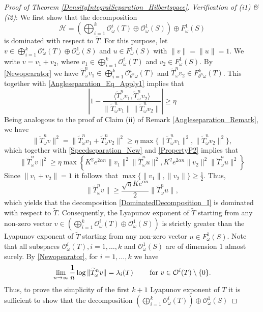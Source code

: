 \documentclass[pdflatex,sn-mathphys-num]{sn-jnl}%
\theoremstyle{thmstyleone}%
\theoremstyle{thmstyletwo}%
\theoremstyle{thmstylethree}%
\newcommand{\cH}{\mathcal{H}}
\numberwithin{equation}{section}
\begin{document}
\begin{proof}[Proof of Theorem \ref{DensityIntegralSeparation_Hilbertspace}]
\noindent 
\emph{Verification of (i1) \& (i2)}: 
We first show that the decomposition 
\begin{equation}\label{DominatedDecomposition_I}
\cH= \left(\bigoplus_{i=1}^k\mathcal O^i_{\omega}(T) \oplus \mathcal O_{\omega}^1(S)\right) \oplus F^1_{\omega}(S)
\end{equation}
is dominated with respect to $\widetilde T$. For this purpose, let $v\in \bigoplus_{i=1}^k\mathcal O^i_{\omega}(T) \oplus \mathcal O_{\omega}^1(S)$ and $u\in F^1_{\omega}(S)$ with $\|v\|=\|u\|=1$. We write $v=v_1+v_2$, where $v_1\in  \bigoplus_{i=1}^k\mathcal O^i_{\omega}(T)$ and $v_2\in F^1_{\omega}(S)$. By \eqref{Newopearator} we have ${\widetilde T}^n_{\omega}v_1\in \bigoplus_{i=1}^k\mathcal O^i_{\theta^n\omega}(T)$ and ${\widetilde T}^n_{\omega}v_2\in F^k_{\theta^n\omega}(T)$. This together with \eqref{Angleseparation_Eq_Apply1} implies that 
\[
\left|1- \frac{\langle  {\widetilde T}^n_{\omega}v_1, {\widetilde T}^n_{\omega}v_2 \rangle}{\|{\widetilde T}^n_{\omega}v_1\|\|{\widetilde T}^n_{\omega}v_2\|}\right|
\geq  
\eta
\]
Being  analogous to the proof of Claim (ii) of Remark \ref{Angleseparation_Remark}, we have 
\[
\|{\widetilde T}^n_{\omega}v\|^2
=
\|{\widetilde T}^n_{\omega}v_1+{\widetilde T}^n_{\omega}v_2\|^2
\geq \eta \max\{\|{\widetilde T}^n_{\omega}v_1\|^2,\|{\widetilde T}^n_{\omega}v_2\|^2\},
\]
which together with \eqref{Speedseparation_New} and \eqref{PropertyP2} implies that
\[
\|{\widetilde T}^n_{\omega}v\|^2
\geq 
\eta\max\left\{
K^2 e^{2\alpha n} \|v_1\|^2\|{\widetilde T}^n_{\omega}u\|^2,  
K^2 e^{2\alpha n} \|v_2\|^2\|{\widetilde T}^n_{\omega}u\|^2
\right\}
\]
Since $\|v_1+v_2\|=1$ it follows that $\max\{\|v_1\|,\|v_2\|\}\geq \frac{1}{2}$. Thus, 
\[
\|{\widetilde T}^n_{\omega}v\|
\geq \frac{\sqrt{\eta} K e^{\alpha n}}{2} \|{\widetilde T}^n_{\omega}u\|,
\]
which yields that the decomposition \eqref{DominatedDecomposition_I} is dominated with respect to $\widetilde T$. Consequently, the Lyapunov exponent of $\widetilde T$ starting from any non-zero vector $v\in \left(\bigoplus_{i=1}^k\mathcal O^i_{\omega}(T) \oplus \mathcal O_{\omega}^1(S)\right)$ is strictly greater than the Lyapunov exponent of $\widetilde T$ starting from any non-zero vector $u\in F^1_{\omega}(S)$. Note that all subspaces $\mathcal O^i_{\omega}(T), i=1,\dots,k$ and $\mathcal O^1_{\omega}(S)$ are of dimension $1$ almost surely. By \eqref{Newopearator}, for $i=1,\dots,k$ we have 
\[
\lim_{n\to\infty}\frac{1}{n}\log\|{\widetilde T}^n_{\omega}v\|=\lambda_i(T) \qquad \hbox{ for } v\in \mathcal O^i(T)\setminus\{0\}.
\]
Thus, to prove the simplicity of the first $k+1$ Lyapunov exponent of $T$ it is sufficient to show that the decomposition $ \left(\bigoplus_{i=1}^k\mathcal O^i_{\omega}(T)\right) \oplus \mathcal O_{\omega}^1(S)$

\end{proof}
\end{document}
